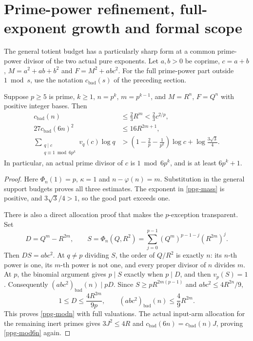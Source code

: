 \section{Prime-power refinement, full-exponent growth and formal scope}
\label{sec-prime-power-compatibility}

The general totient budget has a particularly sharp form at a common
prime-power divisor of the two actual pure exponents. Let $a,b>0$ be
coprime, $c=a+b$, $M=a^2+ab+b^2$ and $F=M^2+ab c^2$.
For the full prime-power part outside $1\bmod s$, use the notation
$c_{\mathrm{bad}}(s)$ of the preceding section.

\begin{corollary}
\label{ppg-full-modulus}
Suppose $p\ge5$ is prime, $k\ge1$, $n=p^k$, $m=p^{k-1}$, and
$M=R^n$, $F=Q^n$ with positive integer bases. Then
\begin{align}
 c_{\mathrm{bad}}(n)&\le\frac23R^m<\frac23c^{2/p},
 \label{ppg-modn}\\
 27c_{\mathrm{bad}}(6n)^2&\le16R^{2m+1},
 \label{ppg-mod6n}\\
 \sum_{\substack{q\mid c\\q\equiv1\bmod6p^k}}v_q(c)\log q
 &>\left(1-\frac2p-\frac1{p^k}\right)\log c
       +\log\frac{3\sqrt3}{4}.
 \label{ppg-mass}
\end{align}
In particular, an actual prime divisor of $c$ is $1\bmod6p^k$,
and is at least $6p^k+1$.
\end{corollary}
\begin{proof}
Here $\Phi_n(1)=p$, $\kappa=1$ and $n-\varphi(n)=m$.
Substitution in the general support budgets proves all three estimates.
The exponent in \eqref{ppg-mass} is positive, and
$3\sqrt3/4>1$, so the good part exceeds one.

There is also a direct allocation proof that makes the $p$-exception
transparent. Set
\[
 D=Q^m-R^{2m},\qquad
 S=\Phi_n(Q,R^2)
  =\sum_{j=0}^{p-1}(Q^m)^{p-1-j}(R^{2m})^j.
\]
Then $DS=ab c^2$. At $q\ne p$ dividing $S$, the order of $Q/R^2$
is exactly $n$: its $n$-th power is one, its $m$-th power is not one,
and every proper divisor of $n$ divides $m$. At $p$, the binomial
argument gives $p\mid S$ exactly when $p\mid D$, and then $v_p(S)=1$.
Consequently $(ab c^2)_{\mathrm{bad}}(n)\mid pD$. Since
$S\ge pR^{2m(p-1)}$ and $ab c^2\le4R^{2n}/9$,
\[
 1\le D\le\frac{4R^{2m}}{9p},\qquad
 (ab c^2)_{\mathrm{bad}}(n)\le\frac49R^{2m}.
\]
This proves \eqref{ppg-modn} with full valuations. The actual input-arm
allocation for the remaining inert primes gives $3J^2\le4R$ and
$c_{\mathrm{bad}}(6n)=c_{\mathrm{bad}}(n)J$, proving
\eqref{ppg-mod6n} again.
\end{proof}

